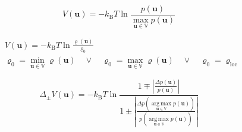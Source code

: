 \documentclass{article}
\DeclareMathOperator*{\argmax}{arg\,max}
\begin{document}
\begin{equation}
	V(\boldsymbol{u}) = -k_{\text{B}} T \ln \frac{ p(\boldsymbol{u}) }
		{ \max\limits_{\boldsymbol{u}\in\mathbb{V}} p(\boldsymbol{u}) }
\end{equation}

\begin{eqnarray}
	& V(\boldsymbol{u}) = -k_{\text{B}} T \ln \frac{ \varrho(\boldsymbol{u}) }{ \varrho_0 } \\[1.25ex]
	& \varrho_0 = \min\limits_{\boldsymbol{u}\in\mathbb{V}} \varrho(\boldsymbol{u})  \quad\lor\quad
		\varrho_0 = \max\limits_{\boldsymbol{u}\in\mathbb{V}} \varrho(\boldsymbol{u})  \quad\lor\quad
		\varrho_0 = \varrho_{\text{loc}} \nonumber
\end{eqnarray}

\begin{equation}
	\Delta_{\pm}V(\boldsymbol{u}) = -k_{\text{B}} T \ln
		\frac{ 1\mp \left| \frac{ \Delta p(\boldsymbol{u}) }{ p(\boldsymbol{u}) }\right| }{ 1 \pm \left|
		\frac{ \Delta p \left( \argmax\limits_{\boldsymbol{u}\in\mathbb{V}} p(\boldsymbol{u}) \right) }
		{p \left( \argmax\limits_{\boldsymbol{u}\in\mathbb{V}} p(\boldsymbol{u}) \right) } \right| }
\end{equation}
\end{document}
